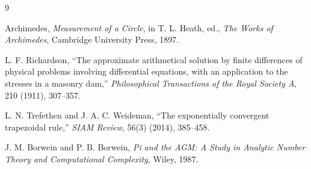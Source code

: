 \documentclass[11pt]{article}
\theoremstyle{remark}
\begin{document}
\begin{thebibliography}{9}

Archimedes,
\emph{Measurement of a Circle}, in T. L. Heath, ed.,
\emph{The Works of Archimedes}, Cambridge University Press, 1897.

L. F. Richardson,
``The approximate arithmetical solution by finite differences of physical
problems involving differential equations, with an application to the
stresses in a masonry dam,''
\emph{Philosophical Transactions of the Royal Society A}, 210 (1911),
307--357.

L. N. Trefethen and J. A. C. Weideman,
``The exponentially convergent trapezoidal rule,''
\emph{SIAM Review}, 56(3) (2014), 385--458.

J. M. Borwein and P. B. Borwein,
\emph{Pi and the AGM: A Study in Analytic Number Theory and Computational
Complexity}, Wiley, 1987.

\end{thebibliography}
\end{document}
